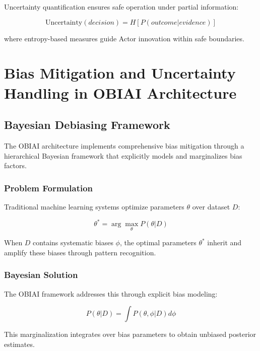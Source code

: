 \documentclass[12pt,a4paper]{article}
\begin{document}
Uncertainty quantification ensures safe operation under partial information:

\begin{equation}
\text{Uncertainty}(decision) = H[P(outcome|evidence)]
\end{equation}

where entropy-based measures guide Actor innovation within safe boundaries.

\clearpage

\section{Bias Mitigation and Uncertainty Handling in OBIAI Architecture}

\subsection{Bayesian Debiasing Framework}

The OBIAI architecture implements comprehensive bias mitigation through a hierarchical Bayesian framework that explicitly models and marginalizes bias factors.

\subsubsection{Problem Formulation}

Traditional machine learning systems optimize parameters $\theta$ over dataset $D$:

\begin{equation}
\theta^* = \arg\max_\theta P(\theta|D)
\end{equation}

When $D$ contains systematic biases $\phi$, the optimal parameters $\theta^*$ inherit and amplify these biases through pattern recognition.

\subsubsection{Bayesian Solution}

The OBIAI framework addresses this through explicit bias modeling:

\begin{equation}
P(\theta|D) = \int P(\theta, \phi|D) d\phi
\end{equation}

This marginalization integrates over bias parameters to obtain unbiased posterior estimates.
\end{document}
